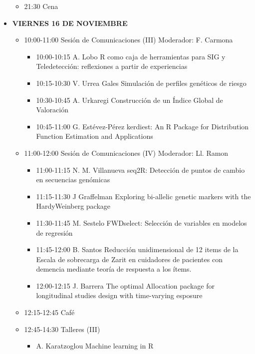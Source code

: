 \begin{itemize}
\begin{itemize}
  \item 21:30 Cena

  \end{itemize}
 

 

\item \textsc{\textbf{VIERNES 16 DE NOVIEMBRE}}

  \begin{itemize}
  \item 10:00-11:00 Sesión de Comunicaciones (III) Moderador:
    F. Carmona
    \begin{itemize}
    \item 10:00-10:15 A. Lobo R como caja de herramientas para SIG
      y Teledetección: reflexiones a partir de experiencias
    \item 10:15-10:30 V. Urrea Gales Simulación de perfiles
      genéticos de riesgo
    \item 10:30-10:45 A. Urkaregi Construcción de un Índice Global
      de Valoración
    \item 10:45-11:00 G. Estévez-Pérez kerdiest: An R Package for
      Distribution Function Estimation and Applications
    \end{itemize}

  \item 11:00-12:00 Sesión de Comunicaciones (IV) Moderador:
    Ll. Ramon
    \begin{itemize}
    \item 11:00-11:15 N. M. Villanueva seq2R: Detección de puntos
      de cambio en secuencias genómicas
    \item 11:15-11:30 J Graffelman Exploring bi-allelic genetic
      markers with the HardyWeinberg package
    \item 11:30-11:45 M. Sestelo FWDselect: Selección de variables
      en modelos de regresión
    \item 11:45-12:00 B. Santos Reducción unidimensional de 12
      items de la Escala de sobrecarga de Zarit en cuidadores de
      pacientes con demencia mediante teoría de respuesta a los
      ítems.
    \item 12:00-12:15 J. Barrera The optimal Allocation package
      for longitudinal studies design with time-varying esposure
    \end{itemize}
  	 
  \item 12:15-12:45 Café

  \item 12:45-14:30 Talleres (III)
    \begin{itemize}
    \item A. Karatzoglou Machine learning in R
    \end{itemize}



\end{itemize}
\end{itemize}

